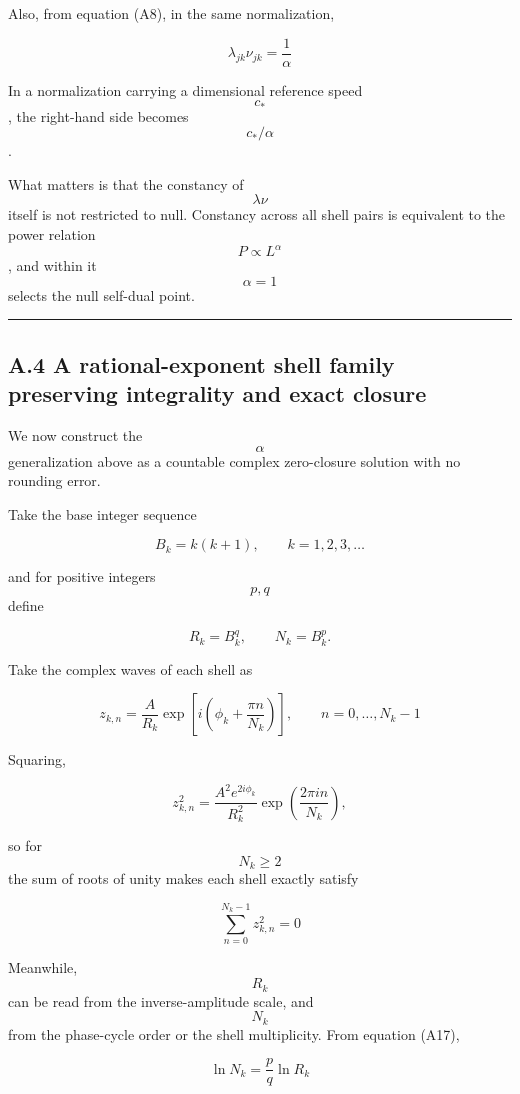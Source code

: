 \documentclass[
  a4paper,
]{article}
\begin{document}
Also, from equation (A8), in the same normalization,

\[
\boxed{
\lambda_{jk}\nu_{jk}
=
\frac{1}{\alpha}
}
\tag{A15}
\]

In a normalization carrying a dimensional reference speed \[c_*\], the
right-hand side becomes \[c_*/\alpha\].

What matters is that the constancy of \[\lambda\nu\] itself is not
restricted to null. Constancy across all shell pairs is equivalent to
the power relation \[P\propto L^\alpha\], and within it \[\alpha=1\]
selects the null self-dual point.

\begin{center}\rule{0.5\linewidth}{0.5pt}\end{center}

\subsection{A.4 A rational-exponent shell family preserving integrality
and exact
closure}\label{a.4-a-rational-exponent-shell-family-preserving-integrality-and-exact-closure}

We now construct the \[\alpha\] generalization above as a countable
complex zero-closure solution with no rounding error.

Take the base integer sequence

\[
B_k=k(k+1),
\qquad
k=1,2,3,\ldots
\tag{A16}
\]

and for positive integers \[p,q\] define

\[
R_k=B_k^q,
\qquad
N_k=B_k^p.
\tag{A17}
\]

Take the complex waves of each shell as

\[
\boxed{
z_{k,n}
=
\frac{A}{R_k}
\exp\left[
i\left(
\phi_k+
\frac{\pi n}{N_k}
\right)
\right],
\qquad
n=0,\ldots,N_k-1
}
\tag{A18}
\]

Squaring,

\[
z_{k,n}^2
=
\frac{A^2e^{2i\phi_k}}{R_k^2}
\exp\left(
\frac{2\pi i n}{N_k}
\right),
\]

so for \[N_k\ge2\] the sum of roots of unity makes each shell exactly
satisfy

\[
\boxed{
\sum_{n=0}^{N_k-1}z_{k,n}^2=0
}
\tag{A19}
\]

Meanwhile, \[R_k\] can be read from the inverse-amplitude scale, and
\[N_k\] from the phase-cycle order or the shell multiplicity. From
equation (A17),

\[
\ln N_k
=
\frac{p}{q}
\ln R_k
\tag{A20}
\]
\end{document}
